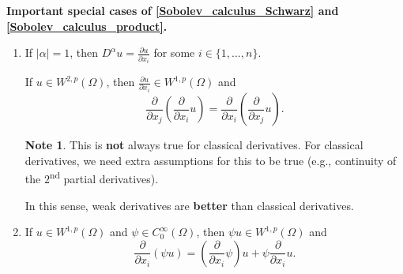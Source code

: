 \documentclass[12pt]{article}
\theoremstyle{definition}
\newtheorem*{note}{Note}
\begin{document}
\textbf{Important special cases of \ref{Sobolev_calculus_Schwarz} and \ref{Sobolev_calculus_product}.}
\begin{enumerate}[label=(\roman*)]
\item If $|\alpha|=1$, then $D^{\alpha}u=\frac{\partial u}{\partial x_i}$ for some $i\in\{1,\ldots,n\}$.

If $u\in W^{2,p}(\Omega)$, then $\frac{\partial u}{\partial x_i}\in W^{1,p}(\Omega)$ and
\[\frac{\partial}{\partial x_j}\left(\frac{\partial}{\partial x_i}u\right)=\frac{\partial}{\partial x_i}\left(\frac{\partial}{\partial x_j}u\right).\]

\begin{note}
This is \textbf{not} always true for classical derivatives. For classical derivatives, we need extra assumptions for this to be true (e.g., continuity of the $2$\textsuperscript{nd} partial derivatives).

In this sense, weak derivatives are \textbf{better} than classical derivatives.
\end{note}

\setcounter{enumi}{3}
\item If $u\in W^{1,p}(\Omega)$ and $\psi\in C_0^{\infty}(\Omega)$, then $\psi u\in W^{1,p}(\Omega)$ and
\[\frac{\partial}{\partial x_i}(\psi u)=\left(\frac{\partial}{\partial x_i}\psi\right)u+\psi\frac{\partial}{\partial x_i}u.\]
\end{enumerate}
\end{document}
